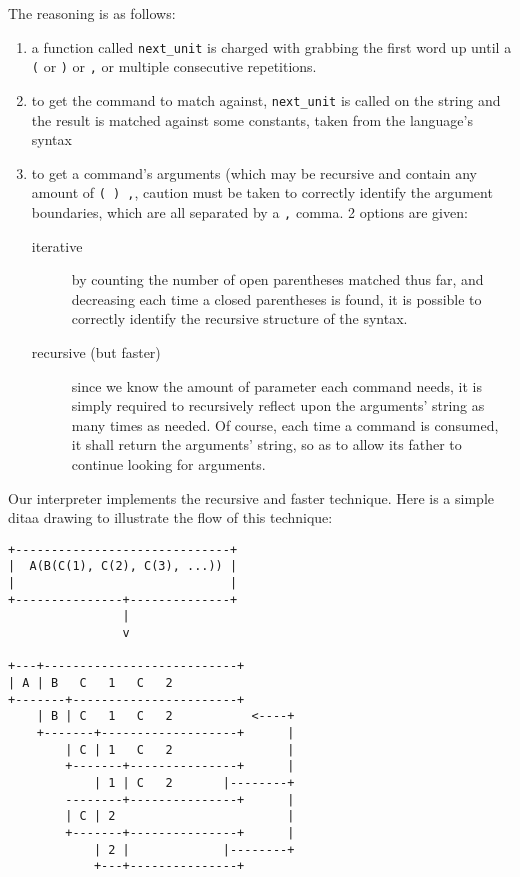 \documentclass[11pt]{article}
\begin{document}
The reasoning is as follows:
\begin{enumerate}
\item a function called \texttt{next\_unit} is charged with grabbing the first word up until a \texttt{(} or \texttt{)} or \texttt{,} or multiple consecutive repetitions.
\item to get the command to match against, \texttt{next\_unit} is called on the string and the result is matched against some constants, taken from the language's syntax
\item to get a command's arguments (which may be recursive and contain any amount of \texttt{( ) ,}, caution must be taken to correctly identify the argument boundaries, which are all separated by a \texttt{,} comma. 2 options are given:
\begin{description}
\item[{iterative}] by counting the number of open parentheses matched thus far, and decreasing each time a closed parentheses is found,
it is possible to correctly identify the recursive structure of the syntax.
\item[{recursive (but faster)}] since we know the amount of parameter each command needs, it is
simply required to recursively reflect upon the arguments' string as many times as needed.
Of course, each time a command is consumed, it shall return the arguments' string, so as to allow its father to continue
looking for arguments.
\end{description}
\end{enumerate}

Our interpreter implements the recursive and faster technique. Here is a simple ditaa drawing to illustrate
the flow of this technique:

\begin{verbatim}
+------------------------------+
|  A(B(C(1), C(2), C(3), ...)) |
|                              |
+---------------+--------------+
                |
                v

+---+---------------------------+
| A | B   C   1   C   2
+-------+-----------------------+
    | B | C   1   C   2           <----+
    +-------+-------------------+      |
        | C | 1   C   2                |
        +-------+---------------+      |
            | 1 | C   2       |--------+
        --------+---------------+      |
        | C | 2                        |
        +-------+---------------+      |
            | 2 |             |--------+
            +---+---------------+
\end{verbatim}
\end{document}
